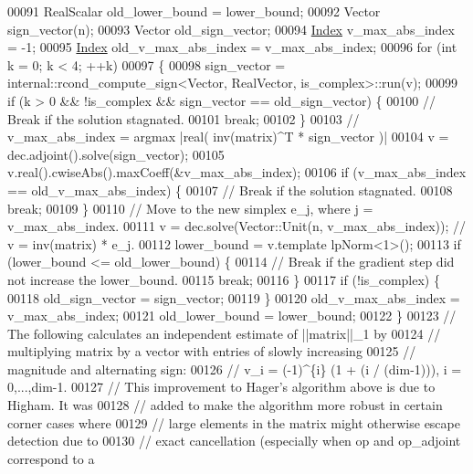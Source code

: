 \begin{DoxyCode}
00091   RealScalar old\_lower\_bound = lower\_bound;
00092   Vector sign\_vector(n);
00093   Vector old\_sign\_vector;
00094   \hyperlink{namespace_eigen_a62e77e0933482dafde8fe197d9a2cfde}{Index} v\_max\_abs\_index = -1;
00095   \hyperlink{namespace_eigen_a62e77e0933482dafde8fe197d9a2cfde}{Index} old\_v\_max\_abs\_index = v\_max\_abs\_index;
00096   \textcolor{keywordflow}{for} (\textcolor{keywordtype}{int} k = 0; k < 4; ++k)
00097   \{
00098     sign\_vector = internal::rcond\_compute\_sign<Vector, RealVector, is\_complex>::run(v);
00099     \textcolor{keywordflow}{if} (k > 0 && !is\_complex && sign\_vector == old\_sign\_vector) \{
00100       \textcolor{comment}{// Break if the solution stagnated.}
00101       \textcolor{keywordflow}{break};
00102     \}
00103     \textcolor{comment}{// v\_max\_abs\_index = argmax |real( inv(matrix)^T * sign\_vector )|}
00104     v = dec.adjoint().solve(sign\_vector);
00105     v.real().cwiseAbs().maxCoeff(&v\_max\_abs\_index);
00106     \textcolor{keywordflow}{if} (v\_max\_abs\_index == old\_v\_max\_abs\_index) \{
00107       \textcolor{comment}{// Break if the solution stagnated.}
00108       \textcolor{keywordflow}{break};
00109     \}
00110     \textcolor{comment}{// Move to the new simplex e\_j, where j = v\_max\_abs\_index.}
00111     v = dec.solve(Vector::Unit(n, v\_max\_abs\_index));  \textcolor{comment}{// v = inv(matrix) * e\_j.}
00112     lower\_bound = v.template lpNorm<1>();
00113     \textcolor{keywordflow}{if} (lower\_bound <= old\_lower\_bound) \{
00114       \textcolor{comment}{// Break if the gradient step did not increase the lower\_bound.}
00115       \textcolor{keywordflow}{break};
00116     \}
00117     \textcolor{keywordflow}{if} (!is\_complex) \{
00118       old\_sign\_vector = sign\_vector;
00119     \}
00120     old\_v\_max\_abs\_index = v\_max\_abs\_index;
00121     old\_lower\_bound = lower\_bound;
00122   \}
00123   \textcolor{comment}{// The following calculates an independent estimate of ||matrix||\_1 by}
00124   \textcolor{comment}{// multiplying matrix by a vector with entries of slowly increasing}
00125   \textcolor{comment}{// magnitude and alternating sign:}
00126   \textcolor{comment}{//   v\_i = (-1)^\{i\} (1 + (i / (dim-1))), i = 0,...,dim-1.}
00127   \textcolor{comment}{// This improvement to Hager's algorithm above is due to Higham. It was}
00128   \textcolor{comment}{// added to make the algorithm more robust in certain corner cases where}
00129   \textcolor{comment}{// large elements in the matrix might otherwise escape detection due to}
00130   \textcolor{comment}{// exact cancellation (especially when op and op\_adjoint correspond to a}

\end{DoxyCode}
